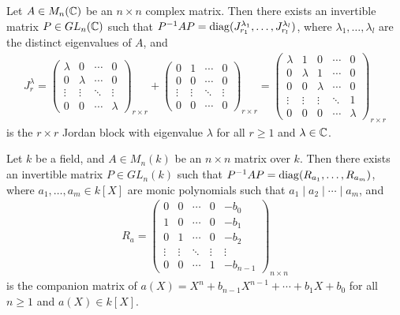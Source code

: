 \begin{theorem}
    Let $A \in M_{n}(\mathbb{C})$ be an $n \times n$ complex matrix. Then there exists an invertible matrix $P \in GL_{n}(\mathbb{C})$ such that $P^{-1}AP = \operatorname{diag} (J_{r_{1}}^{\lambda_{1}},\ldots,J_{r_{l}}^{\lambda_{l}})$, where $\lambda_{1},\ldots,\lambda_{l}$ are the distinct eigenvalues of $A$, and
    \begin{align}
        J_{r}^{\lambda} = \begin{pmatrix}
            \lambda & 0 & \cdots & 0 \\
            0 & \lambda & \cdots & 0 \\
            \vdots & \vdots & \ddots & \vdots \\
            0 & 0 & \cdots & \lambda
        \end{pmatrix}_{r \times r} + \begin{pmatrix}
            0 & 1 & \cdots & 0 \\
            0 & 0 & \cdots & 0 \\
            \vdots & \vdots & \ddots & \vdots \\
            0 & 0 & \cdots & 0
        \end{pmatrix}_{r \times r} = \begin{pmatrix}
            \lambda & 1 & 0 & \cdots & 0 \\
            0 & \lambda & 1 & \cdots & 0 \\
            0 & 0 & \lambda & \cdots & 0 \\
            \vdots & \vdots & \vdots & \ddots & 1 \\
            0 & 0 & 0 & \cdots & \lambda
        \end{pmatrix}_{r \times r}
    \end{align}
    is the $r \times r$ Jordan block with eigenvalue $\lambda$ for all $r \geq 1$ and $\lambda \in \mathbb{C}$. 
\end{theorem}

\begin{theorem}
    Let $k$ be a field, and $A \in M_{n}(k)$ be an $n \times n$ matrix over $k$. Then there exists an invertible matrix $P \in GL_{n}(k)$ such that $P^{-1}AP = \operatorname{diag} (R_{a_{1}},\ldots,R_{a_{m}})$, where $a_{1},\ldots,a_{m} \in k[X]$ are monic polynomials such that $a_{1} \mid a_{2} \mid \cdots \mid a_{m}$, and
    \begin{align}
        R_{a} = \begin{pmatrix}
            0 & 0 & \cdots & 0 & -b_{0} \\
            1 & 0 & \cdots & 0 & -b_{1} \\
            0 & 1 & \cdots & 0 & -b_{2} \\
            \vdots & \vdots & \ddots & \vdots & \vdots \\
            0 & 0 & \cdots & 1 & -b_{n-1}
        \end{pmatrix}_{n \times n}
    \end{align}
    is the companion matrix of $a(X) = X^{n} + b_{n-1}X^{n-1} + \cdots + b_{1}X + b_{0}$ for all $n \geq 1$ and $a(X) \in k[X]$.
\end{theorem}

